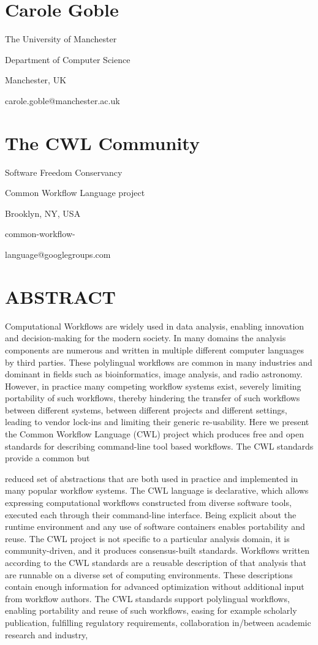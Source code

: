\documentclass[
]{article}
\begin{document}
\section{Carole Goble}\label{carole-goble}

The University of Manchester

Department of Computer Science

Manchester, UK

carole.goble@manchester.ac.uk

\section{The CWL Community}\label{the-cwl-community}

Software Freedom Conservancy

Common Workflow Language project

Brooklyn, NY, USA

common-workflow-

language@googlegroups.com

\section{ABSTRACT}\label{abstract}

Computational Workflows are widely used in data analysis, enabling
innovation and decision-making for the modern society. In many domains
the analysis components are numerous and written in multiple different
computer languages by third parties. These polylingual workflows are
common in many industries and dominant in fields such as bioinformatics,
image analysis, and radio astronomy. However, in practice many competing
workflow systems exist, severely limiting portability of such workflows,
thereby hindering the transfer of such workflows between different
systems, between different projects and different settings, leading to
vendor lock-ins and limiting their generic re-usability. Here we present
the Common Workflow Language (CWL) project which produces free and open
standards for describing command-line tool based workflows. The CWL
standards provide a common but

reduced set of abstractions that are both used in practice and
implemented in many popular workflow systems. The CWL language is
declarative, which allows expressing computational workflows constructed
from diverse software tools, executed each through their command-line
interface. Being explicit about the runtime environment and any use of
software containers enables portability and reuse. The CWL project is
not specific to a particular analysis domain, it is community-driven,
and it produces consensus-built standards. Workflows written according
to the CWL standards are a reusable description of that analysis that
are runnable on a diverse set of computing environments. These
descriptions contain enough information for advanced optimization
without additional input from workflow authors. The CWL standards
support polylingual workflows, enabling portability and reuse of such
workflows, easing for example scholarly publication, fulfilling
regulatory requirements, collaboration in/between academic research and
industry,
\end{document}
